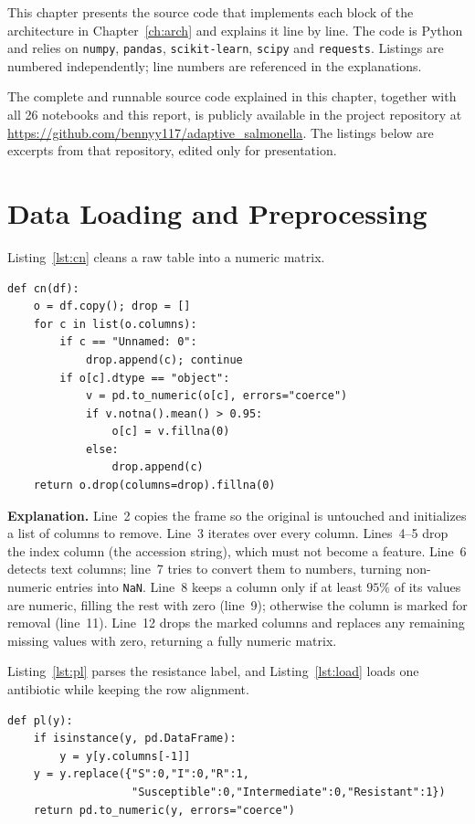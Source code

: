 \documentclass[../main.tex]{subfiles}
\begin{document}
This chapter presents the source code that implements each block of the architecture in Chapter~\ref{ch:arch} and explains it line by line. The code is Python and relies on \texttt{numpy}, \texttt{pandas}, \texttt{scikit-learn}, \texttt{scipy} and \texttt{requests}. Listings are numbered independently; line numbers are referenced in the explanations.

The complete and runnable source code explained in this chapter, together with all 26 notebooks and this report, is publicly available in the project repository at \url{https://github.com/bennyy117/adaptive_salmonella}. The listings below are excerpts from that repository, edited only for presentation.

\section{Data Loading and Preprocessing}

Listing~\ref{lst:cn} cleans a raw table into a numeric matrix.

\begin{lstlisting}[caption={Numeric coercion of a raw table.},label=lst:cn]
def cn(df):
    o = df.copy(); drop = []
    for c in list(o.columns):
        if c == "Unnamed: 0":
            drop.append(c); continue
        if o[c].dtype == "object":
            v = pd.to_numeric(o[c], errors="coerce")
            if v.notna().mean() > 0.95:
                o[c] = v.fillna(0)
            else:
                drop.append(c)
    return o.drop(columns=drop).fillna(0)
\end{lstlisting}

\noindent\textbf{Explanation.} Line~2 copies the frame so the original is untouched and initializes a list of columns to remove. Line~3 iterates over every column. Lines~4--5 drop the index column (the accession string), which must not become a feature. Line~6 detects text columns; line~7 tries to convert them to numbers, turning non-numeric entries into \texttt{NaN}. Line~8 keeps a column only if at least $95\%$ of its values are numeric, filling the rest with zero (line~9); otherwise the column is marked for removal (line~11). Line~12 drops the marked columns and replaces any remaining missing values with zero, returning a fully numeric matrix.

Listing~\ref{lst:pl} parses the resistance label, and Listing~\ref{lst:load} loads one antibiotic while keeping the row alignment.

\begin{lstlisting}[caption={Label parsing to $\{0,1\}$.},label=lst:pl]
def pl(y):
    if isinstance(y, pd.DataFrame):
        y = y[y.columns[-1]]
    y = y.replace({"S":0,"I":0,"R":1,
                   "Susceptible":0,"Intermediate":0,"Resistant":1})
    return pd.to_numeric(y, errors="coerce")
\end{lstlisting}
\end{document}
